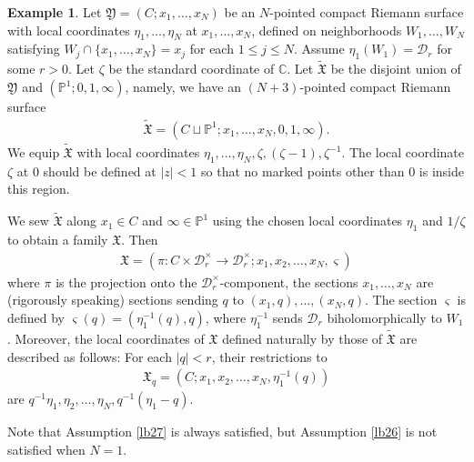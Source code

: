 \documentclass[12pt,a4paper,notitlepage]{article}
\theoremstyle{definition}
\newtheorem{eg}[df]{Example}
\theoremstyle{plain}
\newcommand{\fk}{\mathfrak}
\newcommand{\mc}{\mathcal}
\newcommand{\wtd}{\widetilde}
\newcommand{\sgm}{\varsigma}
\newcommand{\Cbb}{\mathbb C}
\newcommand{\Pbb}{\mathbb P}
\numberwithin{equation}{section}
\begin{document}
\begin{eg}\label{lb9}
Let $\fk Y=(C;x_1,\dots,x_N)$ be an $N$-pointed compact Riemann surface with local coordinates $\eta_1,\dots,\eta_N$ at $x_1,\dots,x_N$, defined on neighborhoods $W_1,\dots,W_N$ satisfying $W_j\cap\{x_1,\dots,x_N\}=x_j$ for each $1\leq j\leq N$. Assume $\eta_1(W_1)=\mc D_r$ for some $r>0$. Let $\zeta$ be the standard coordinate of $\Cbb$. Let $\wtd{\fk X}$ be the disjoint union of $\fk Y$ and $(\Pbb^1;0,1,\infty)$, namely, we have an $(N+3)$-pointed compact Riemann surface
\begin{align*}
\wtd{\fk X}=(C\sqcup \Pbb^1;x_1,\dots,x_N,0,1,\infty).	
\end{align*}
We equip $\wtd{\fk X}$ with local coordinates $\eta_1,\dots,\eta_N,\zeta,(\zeta-1),\zeta^{-1}$. The local coordinate $\zeta$ at $0$ should be defined at $|z|<1$ so that no marked points other than $0$ is inside this region.

We sew $\wtd{\fk X}$ along $x_1\in C$ and $\infty\in\Pbb^1$ using the chosen local coordinates $\eta_1$ and $1/\zeta$ to obtain a family $\fk X$. Then
\begin{align*}
\fk X=(\pi: C\times\mc D_r^\times\rightarrow\mc D_r^\times;x_1,x_2,\dots,x_N,\sgm)	
\end{align*}
where $\pi$ is the projection onto the $\mc D_r^\times$-component, the sections $x_1,\dots,x_N$ are (rigorously speaking) sections sending $q$ to $(x_1,q),\dots,(x_N,q)$. The section $\sgm$ is defined by $\sgm(q)=(\eta_1^{-1}(q),q)$, where $\eta_1^{-1}$ sends $\mc D_r$ biholomorphically to $W_1$. Moreover, the local coordinates of $\fk X$ defined naturally by those of $\wtd{\fk X}$ are described as follows: For each $|q|<r$, their restrictions to
\begin{align}
\fk X_q=(C;x_1,x_2,\dots,x_N,\eta_1^{-1}(q))  \label{eq31}	
\end{align}
are $q^{-1}\eta_1,\eta_2,\dots,\eta_N,q^{-1}(\eta_1-q)$. 

Note that Assumption \ref{lb27} is always satisfied, but Assumption \ref{lb26} is not satisfied when $N=1$.


\end{eg}
\end{document}
